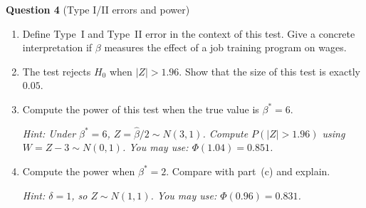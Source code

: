 \documentclass[11pt,a4paper]{article}
\begin{document}
\bigskip
\textbf{Question 4} (Type I/II errors and power)

\begin{enumerate}[label=(\alph*)]
\item Define Type~I and Type~II error in the context of this test. Give a concrete interpretation if $\beta$ measures the effect of a job training program on wages.

\begin{answerbox}
\vspace{4cm}
\end{answerbox}

\item The test rejects $H_0$ when $|Z| > 1.96$. Show that the size of this test is exactly $0.05$.

\begin{answerbox}
\vspace{4.5cm}
\end{answerbox}

\newpage
\item Compute the power of this test when the true value is $\beta^* = 6$.

\textcolor{hintcolor}{\emph{Hint: Under $\beta^* = 6$, $Z = \hat{\beta}/2 \sim N(3, 1)$. Compute $P(|Z| > 1.96)$ using $W = Z - 3 \sim N(0,1)$. You may use: $\Phi(1.04) = 0.851$.}}

\begin{answerbox}
\vspace{6cm}
\end{answerbox}

\item Compute the power when $\beta^* = 2$. Compare with part~(c) and explain.

\textcolor{hintcolor}{\emph{Hint: $\delta = 1$, so $Z \sim N(1,1)$. You may use: $\Phi(0.96) = 0.831$.}}

\begin{answerbox}
\vspace{6cm}
\end{answerbox}

\end{enumerate}
\end{document}
